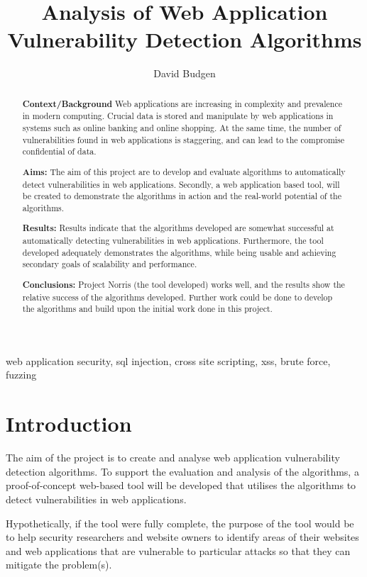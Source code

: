 \documentclass[12pt,a4paper]{article}
\title{Analysis of Web Application Vulnerability Detection Algorithms}
\author{David Budgen}
\date{}
\begin{document}
\maketitle

\begin{abstract}
    
    {\bf Context/Background}
    Web applications are increasing in complexity and prevalence in modern computing. Crucial data is stored and manipulate by web applications in systems such as online banking and online shopping.  At the same time, the number of vulnerabilities found in web applications is staggering, and can lead to the compromise confidential of data.
    
    {\bf Aims:}
    The aim of this project are to develop and evaluate algorithms to automatically detect vulnerabilities in web applications.  Secondly, a web application based tool, will be created to demonstrate the algorithms in action and the real-world potential of the algorithms.
    
    {\bf Results:}
    Results indicate that the algorithms developed are somewhat successful at automatically detecting vulnerabilities in web applications.  Furthermore, the tool developed adequately demonstrates the algorithms, while being usable and achieving secondary goals of scalability and performance.
    
    {\bf Conclusions:}
    Project Norris (the tool developed) works well, and the results show the relative success of the algorithms developed.  Further work could be done to develop the algorithms and build upon the initial work done in this project.
\end{abstract}

\begin{keywords}
    web application security, sql injection, cross site scripting, xss, brute force, fuzzing
\end{keywords}

\section{Introduction}
The aim of the project is to create and analyse web application vulnerability detection algorithms.  To support the evaluation and analysis of the algorithms, a proof-of-concept web-based tool will be developed that utilises the algorithms to detect vulnerabilities in web applications.

Hypothetically, if the tool were fully complete, the purpose of the tool would be to help security researchers and website owners to identify areas of their websites and web applications that are vulnerable to particular attacks so that they can mitigate the problem(s).
\end{document}
